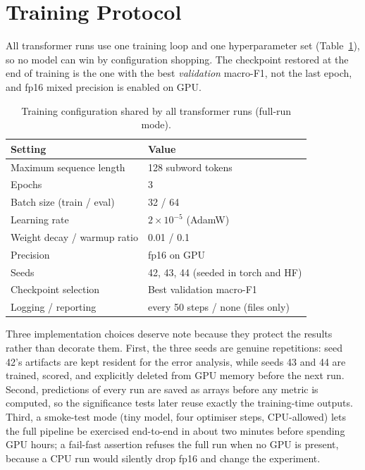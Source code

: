 \section{Training Protocol}
\label{sec:training}

All transformer runs use one training loop and one hyperparameter set
(Table~\ref{tab:hyperparams}), so no model can win by configuration shopping. The
checkpoint restored at the end of training is the one with the best
\emph{validation} macro-F1, not the last epoch, and fp16 mixed precision is
enabled on GPU.

\begin{table}[htbp]
\centering
\caption[Training configuration shared by all transformer runs]{Training configuration shared by all transformer runs (full-run mode).}
\label{tab:hyperparams}
\small
\begin{tabular}{ll}
\toprule
Setting & Value \\
\midrule
Maximum sequence length & 128 subword tokens \\
Epochs & 3 \\
Batch size (train / eval) & 32 / 64 \\
Learning rate & $2\times10^{-5}$ (AdamW) \\
Weight decay / warmup ratio & 0.01 / 0.1 \\
Precision & fp16 on GPU \\
Seeds & 42, 43, 44 (seeded in torch and HF) \\
Checkpoint selection & Best validation macro-F1 \\
Logging / reporting & every 50 steps / none (files only) \\
\bottomrule
\end{tabular}
\end{table}

Three implementation choices deserve note because they protect the results rather
than decorate them. First, the three seeds are genuine repetitions: seed 42's
artifacts are kept resident for the error analysis, while seeds 43 and 44 are
trained, scored, and explicitly deleted from GPU memory before the next run.
Second, predictions of every run are saved as arrays before any metric is
computed, so the significance tests later reuse exactly the training-time outputs.
Third, a smoke-test mode (tiny model, four optimiser steps, CPU-allowed) lets the
full pipeline be exercised end-to-end in about two minutes before spending GPU
hours; a fail-fast assertion refuses the full run when no GPU is present, because
a CPU run would silently drop fp16 and change the experiment.

